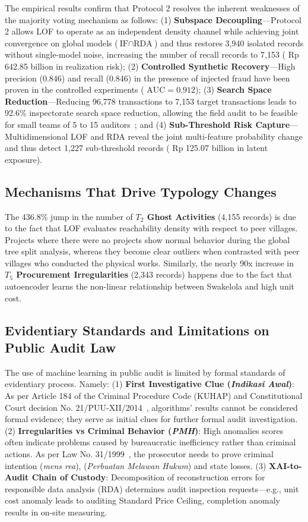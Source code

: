 \documentclass[conference]{IEEEtran}
\begin{document}
The empirical results confirm that Protocol 2 resolves the inherent weaknesses of the majority voting mechanism as follows: (1) \textbf{Subspace Decoupling}—Protocol 2 allows LOF to operate as an independent density channel while achieving joint convergence on global models ($\text{IF} \cap \text{RDA}$) and thus restores 3,940 isolated records without single-model noise, increasing the number of recall records to 7,153 ( Rp 642.85 billion in realization risk); (2) \textbf{Controlled Synthetic Recovery}—High precision (0.846) and recall (0.846) in the presence of injected fraud have been proven in the controlled experiments ( $\text{AUC} = 0.912$); (3) \textbf{Search Space Reduction}—Reducing 96,778 transactions to 7,153 target transactions leads to 92.6\% inspectorate search space reduction, allowing the field audit to be feasible for small teams of 5 to 15 auditors~\cite{ref12}; and (4) \textbf{Sub-Threshold Risk Capture}—Multidimensional LOF and RDA reveal the joint multi-feature probability change and thus detect 1,227 sub-threshold records ( Rp 125.07 billion in latent exposure).

\subsection{Mechanisms That Drive Typology Changes}

The 436.8\% jump in the number of \textbf{$T_2$ Ghost Activities} (4,155 records) is due to the fact that LOF evaluates reachability density with respect to peer villages. Projects where there were no projects show normal behavior during the global tree split analysis, whereas they become clear outliers when contrasted with peer villages who conducted the physical works. Similarly, the nearly 90x increase in \textbf{$T_5$ Procurement Irregularities} (2,343 records) happens due to the fact that autoencoder learns the non-linear relationship between Swakelola and high unit cost.

\subsection{Evidentiary Standards and Limitations on Public Audit Law}

The use of machine learning in public audit is limited by formal standards of evidentiary process. Namely: (1) \textbf{First Investigative Clue (\textit{Indikasi Awal})}: As per Article 184 of the Criminal Procedure Code (KUHAP) and Constitutional Court decision No. 21/PUU-XII/2014~\cite{ref34}, algorithms’ results cannot be considered formal evidence; they serve as initial clues for further formal audit investigation. (2) \textbf{Irregularities vs Criminal Behavior (\textit{PMH})}: High anomalies scores often indicate problems caused by bureaucratic inefficiency rather than criminal actions. As per Law No. 31/1999~\cite{ref34}, the prosecutor needs to prove criminal intention (\textit{mens rea}), (\textit{Perbuatan Melawan Hukum}) and state losses. (3)  \textbf{XAI-to-Audit Chain of Custody}: Decomposition of reconstruction errors for responsible data analysis (RDA) determines audit inspection requests—e.g., unit cost anomaly leads to auditing Standard Price Ceiling, completion anomaly results in on-site measuring.
\end{document}
